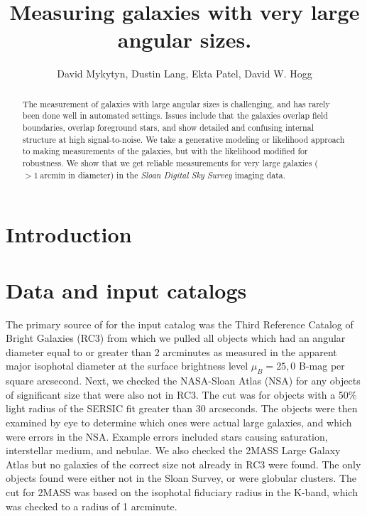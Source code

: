 \documentclass[12pt,preprint,dvipdf]{aastex}
\newcounter{address}
\newcommand{\project}[1]{\textsl{#1}}
\newcommand{\units}[1]{\mathrm{#1}}
\renewcommand{\arcmin}{\units{arcmin}}
\begin{document}
\title{
       Measuring galaxies with very large angular sizes.
      }
\author{
        David Mykytyn\altaffilmark{\ref{CCPP}},
        Dustin Lang\altaffilmark{\ref{CMU}},
        Ekta Patel\altaffilmark{\ref{CCPP}},
        David W. Hogg\altaffilmark{\ref{CCPP},\ref{MPIA},\ref{email}}
       }
\setcounter{address}{1}

\begin{abstract}
The measurement of galaxies with large angular sizes is challenging,
and has rarely been done well in automated settings.  Issues include
that the galaxies overlap field boundaries, overlap foreground stars,
and show detailed and confusing internal structure at high
signal-to-noise.  We take a generative modeling or likelihood approach
to making measurements of the galaxies, but with the likelihood
modified for robustness.  We show that we get reliable measurements
for very large galaxies ($>1~\arcmin$ in diameter) in the
\project{Sloan Digital Sky Survey} imaging data.
\end{abstract}

\section{Introduction}

\section{Data and input catalogs}
The primary source of for the input catalog was the Third Reference Catalog of Bright Galaxies (RC3) from which we pulled all objects which had an angular diameter equal to or greater than 2 arcminutes as measured in the apparent major isophotal diameter at the surface brightness level $\mu_B = 25,0$ B-mag per square arcsecond. Next, we checked the NASA-Sloan Atlas (NSA) for any objects of significant size that were also not in RC3. The cut was for objects with a 50\% light radius of the SERSIC fit greater than 30 arcseconds. The objects were then examined by eye to determine which ones were actual large galaxies, and which were errors in the NSA. Example errors included stars causing saturation, interstellar medium, and nebulae. We also checked the 2MASS Large Galaxy Atlas but no galaxies of the correct size not already in RC3 were found. The only objects found were either not in the Sloan Survey, or were globular clusters. The cut for 2MASS was based on the isophotal fiduciary radius in the K-band, which was checked to a radius of 1 arcminute.
\end{document}
